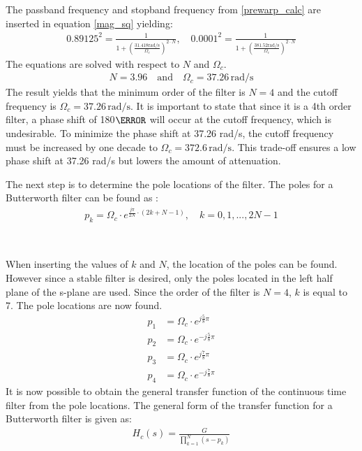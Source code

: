 The passband frequency and stopband frequency from \autoref{prewarp_calc} are inserted in equation \autoref{mag_sq} yielding:
\begin{align}
0.89125^2 = \frac{1}{1+(\frac{31.418 \text{rad/s}}{\Omega_c})^{2 \cdot N}}, \quad 0.0001^2 = \frac{1}{1+(\frac{381.52 \text{rad/s}}{\Omega_c})^{2 \cdot N}}
\label{mag_sq_calc}
\end{align}
The equations are solved with respect to $N$ and $\Omega_c$.
\begin{align}
N = 3.96 	\quad \text{and} \quad \Omega_c = 37.26 \, \text{rad/s}
\label{mag_sq_res}
\end{align}
The result yields that the minimum order of the filter is $N=4$ and the cutoff frequency is $\Omega_c = 37.26 \, \text{rad/s}$. It is important to state that since it is a 4th order filter, a phase shift of 180$\degree$ will occur at the cutoff frequency, which is undesirable. To minimize the phase shift at 37.26 rad/s, the cutoff frequency must be increased by one decade to $\Omega_c = 372.6 \, \text{rad/s}$. This trade-off ensures a low phase shift at 37.26 rad/s but lowers the amount of attenuation.

The next step is to determine the pole locations of the filter. The poles for a Butterworth filter can be found as \citep[p. 1041]{oppenheim}:
\begin{align}
p_k = \Omega_c \cdot e^{\frac{j\pi}{2N}\cdot (2k+N-1)}, \quad k=0,1, ..., 2N-1
\label{det_poles}
\end{align}
\begin{where}
\\
\end{where}

When inserting the values of $k$ and $N$, the location of the poles can be found. However since a stable filter is desired, only the poles located in the left half plane of the s-plane are used. Since the order of the filter is $N=4$, $k$ is equal to 7. The pole locations are now found.
\begin{align}
p_1 &= \Omega_c \cdot e^{j \frac{5}{8} \pi}\\
p_2 &= \Omega_c \cdot e^{-j \frac{5}{8} \pi}\\
p_3 &= \Omega_c \cdot e^{j \frac{7}{8} \pi}\\
p_4 &= \Omega_c \cdot e^{-j \frac{7}{8} \pi}
\label{det_poles_res}
\end{align}
It is now possible to obtain the general transfer function of the continuous time filter from the pole locations. The general form of the transfer function for a Butterworth filter is given as:
\begin{align}
H_c(s) = \frac{G}{\prod\limits_{k=1}^{N}(s-p_k)} 
\label{trans_func_general}
\end{align}
\begin{where}
\\
\\
\end{where}

